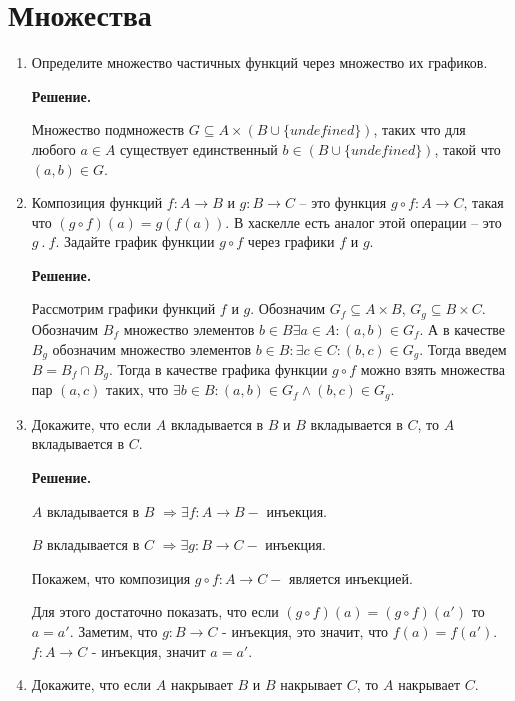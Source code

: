 \section*{Множества}
\begin{enumerate}

\item Определите множество частичных функций через множество их графиков.

\textbf{Решение.} 

Множество подмножеств $G \subseteq A \times (B \cup \{undefined\})$,
таких что для любого $a \in A$ существует единственный
$b \in (B \cup \{undefined\})$, такой что $(a, b) \in G$.

\item Композиция функций $f : A \to B$ и $g : B \to C$ -- это функция $g 
\circ f : A \to C$, 
такая что $(g \circ f)(a) = g(f(a))$.
    В хаскелле есть аналог этой операции -- это $g\ .\ f$.
    Задайте график функции $g \circ f$ через графики $f$ и $g$.

\textbf{Решение.} 

Рассмотрим графики функций $f$ и $g$. Обозначим $G_f \subseteq A \times 
B$, $G_g \subseteq B \times C$. Обозначим $B_f$ множество элементов $b \in 
B \exists a \in A : (a, b) \in G_f$. А в качестве $B_g$ обозначим 
множество элементов $b\in B : \exists c \in C : (b, c) \in G_g$. Тогда введем $B = B_f \cap B_g$. Тогда в качестве графика функции $g \circ f$ 
можно взять множества пар $(a, c)$ 
таких, что $\exists b \in B : (a, b) \in G_f \land (b, c) \in G_g$.  

\item Докажите, что если $A$ вкладывается в $B$ и $B$ вкладывается в $C$, 
то $A$ вкладывается в $C$.

\textbf{Решение.} 

$A$ вкладывается в $B$ $\Rightarrow \exists f:A\rightarrow B - $ инъекция.

$B$ вкладывается в $C$ $\Rightarrow \exists g:B\rightarrow C - $ инъекция.

Покажем, что композиция $g \circ f : A\rightarrow C - $ является инъекцией.

Для этого достаточно показать, что если $(g \circ f)(a) = (g \circ f)(a')$ 
то $a = a'$. Заметим, что $g:B\rightarrow C$ - инъекция, это значит, что 
$f(a) = f(a')$. $f:A\rightarrow C$ - инъекция, значит $a = a'$.

\item Докажите, что если $A$ накрывает $B$ и $B$ накрывает $C$, то $A$ накрывает $C$.


\end{enumerate}
